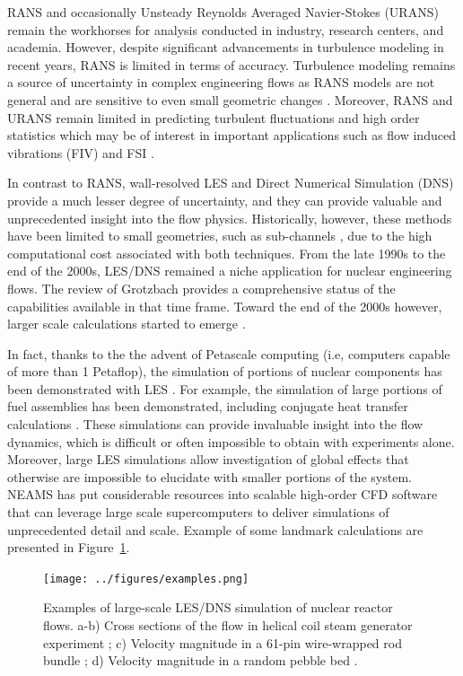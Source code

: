\documentclass[11pt,letterpaper,english]{article}
\begin{document}
RANS \cite{conner2010cfd} and occasionally Unsteady Reynolds Averaged Navier-Stokes (URANS) remain the workhorses for analysis conducted in industry, research centers, and academia.  However, despite significant advancements in turbulence modeling in recent years, RANS is limited in terms of accuracy. Turbulence modeling remains a source of uncertainty in complex engineering flows as RANS models are not general and are sensitive to even small geometric changes \cite{merzari2010numerical}. Moreover, RANS and URANS remain limited in predicting turbulent fluctuations and high order statistics which may be of interest in important applications such as flow induced vibrations (FIV) and FSI \cite{yuan2017flow}.

In contrast to RANS, wall-resolved LES and Direct Numerical Simulation (DNS) provide a much lesser degree of uncertainty, and they can provide valuable and unprecedented insight into the flow physics. Historically, however, these methods have been limited to small geometries, such as sub-channels \cite{grotzbach1999direct}, due to the high computational cost associated with both techniques. From the late 1990s to the end of the 2000s, LES/DNS remained a niche application for nuclear engineering flows. The review of Grotzbach \cite{grotzbach1999direct} provides a comprehensive status of the capabilities available in that time frame. Toward the end of the 2000s however, larger scale calculations started to emerge \cite{pointer2009simulations}.

In fact, thanks to the the advent of Petascale computing (i.e, computers capable of more than 1 Petaflop), the simulation of portions of nuclear components has been demonstrated with LES \cite{merzari2017large}. For example, the simulation of large portions of fuel assemblies has been demonstrated, including conjugate heat transfer calculations \cite{obabko2019}. These simulations can provide invaluable insight into the flow dynamics, which is difficult or often impossible to obtain with experiments alone. Moreover, large LES simulations allow investigation of global effects that otherwise are impossible to elucidate with smaller portions of the system. NEAMS has put considerable resources into scalable high-order CFD software that can leverage large scale supercomputers to deliver simulations of unprecedented detail and scale. Example of some landmark calculations are presented in Figure~\ref{f:examples}.

\begin{figure}[!ht]
\centering
\texttt{[image: ../figures/examples.png]}
\caption{Examples of large-scale LES/DNS simulation of nuclear reactor flows. a-b) Cross sections of the flow in helical coil steam generator experiment \cite{alper2018}; c) Velocity magnitude in a 61-pin wire-wrapped rod bundle \cite{goth2018comparison}; d) Velocity magnitude in a random pebble bed \cite{yuan2019}.}
\label{f:examples}
\end{figure}
\end{document}
